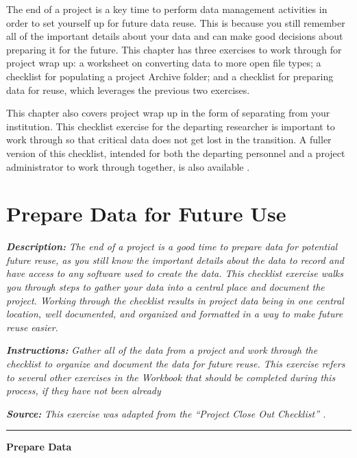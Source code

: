 \documentclass[
]{book}
\begin{document}
The end of a project is a key time to perform data management activities in order to set yourself up for future data reuse. This is because you still remember all of the important details about your data and can make good decisions about preparing it for the future. This chapter has three exercises to work through for project wrap up: a worksheet on converting data to more open file types; a checklist for populating a project Archive folder; and a checklist for preparing data for reuse, which leverages the previous two exercises.

This chapter also covers project wrap up in the form of separating from your institution. This checklist exercise for the departing researcher is important to work through so that critical data does not get lost in the transition. A fuller version of this checklist, intended for both the departing personnel and a project administrator to work through together, is also available \citep{goben_data_2023}.

\hypertarget{future-use}{%
\section{Prepare Data for Future Use}\label{future-use}}

\textbf{\emph{Description:}} \emph{The end of a project is a good time to prepare data for potential future reuse, as you still know the important details about the data to record and have access to any software used to create the data. This checklist exercise walks you through steps to gather your data into a central place and document the project. Working through the checklist results in project data being in one central location, well documented, and organized and formatted in a way to make future reuse easier.}

\textbf{\emph{Instructions:}} \emph{Gather all of the data from a project and work through the checklist to organize and document the data for future reuse. This exercise refers to several other exercises in the Workbook that should be completed during this process, if they have not been already}

\textbf{\emph{Source:}} \emph{This exercise was adapted from the ``Project Close Out Checklist'' \citep{briney_project_2020}.}

\begin{center}\rule{0.5\linewidth}{0.5pt}\end{center}

\textbf{Prepare Data}
\end{document}
